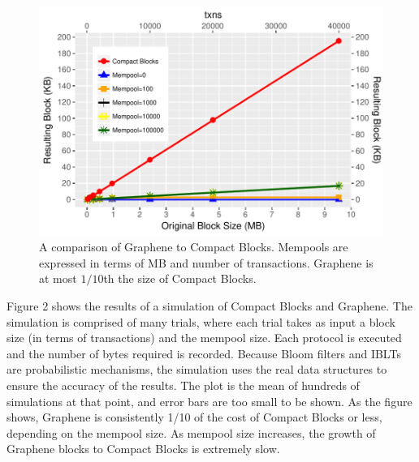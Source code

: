 \begin{figure}\begin{center}
	\includegraphics[width=1\textwidth]{graphs/graphene}
	\caption{A comparison of Graphene to Compact Blocks.
Mempools are expressed in terms of MB and number of transactions. Graphene is at most $1/10$th the size of Compact Blocks.  
	\label{fig:graphene}}
\end{center}\end{figure}

Figure 2 shows the results of a simulation of
Compact Blocks and Graphene. The simulation is comprised
of many trials, where each trial takes as input a block size (in terms
of transactions) and the mempool size. Each protocol is executed and the
number of bytes required is recorded. Because Bloom filters
and IBLTs are probabilistic mechanisms, the simulation uses
the real data structures to ensure the accuracy of the results.
The plot is the mean of hundreds of simulations
at that point, and error bars are too small to be shown.
As the figure shows, Graphene is consistently 1/10 of the
cost of Compact Blocks or less, depending on the mempool
size. As mempool size increases, the growth of Graphene blocks to Compact Blocks is extremely slow.

